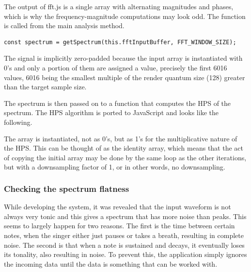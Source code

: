 

The output of fft.js is a single array with alternating magnitudes and phases, which is why the frequency-magnitude computations may look odd. The function is called from the main analysis method.

\begin{lstlisting}[style=javascript, caption={Calling the getSpectrum function from the analysis function.}]
    const spectrum = getSpectrum(this.fftInputBuffer, FFT_WINDOW_SIZE);
\end{lstlisting}

The signal is implicitly zero-padded because the input array is instantiated with 0's and only a portion of them are assigned a value, precisely the first 6016 values, 6016 being the smallest multiple of the render quantum size (128) greater than the target sample size.

The spectrum is then passed on to a function that computes the HPS of the spectrum. The HPS algorithm is ported to JavaScript and looks like the following. 



The array is instantiated, not as 0's, but as 1's for the multiplicative nature of the HPS. This can be thought of as the identity array, which means that the act of copying the initial array may be done by the same loop as the other iterations, but with a downsampling factor of 1, or in other words, no downsampling.

\subsubsection{Checking the spectrum flatness}
While developing the system, it was revealed that the input waveform is not always very tonic and this gives a spectrum that has more noise than peaks. This seems to largely happen for two reasons. The first is the time between certain notes, when the singer either just pauses or takes a breath, resulting in complete noise. The second is that when a note is sustained and decays, it eventually loses its tonality, also resulting in noise. To prevent this, the application simply ignores the incoming data until the data is something that can be worked with. 


